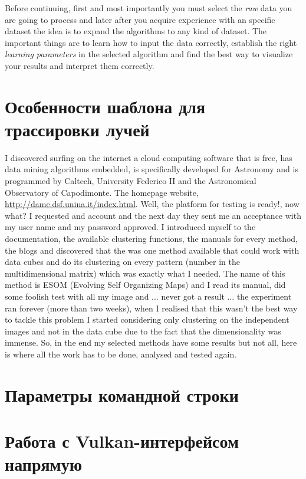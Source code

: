 \documentclass[11pt,fleqn,english,russian]{report} %
\begin{document}
Before continuing, first and most importantly you must select the \emph{raw} data you are going to process and later after you acquire experience with an specific dataset the idea is to expand the algorithms to any kind of dataset. The important things are to learn how to input the data correctly, establish the right \emph{learning parameters} in the selected algorithm and find the best way to visualize your results and interpret them correctly.

\chapter{Особенности шаблона для трассировки лучей}

I discovered surfing on the internet a cloud computing software that is free, has data mining algorithms embedded, is specifically developed for Astronomy and is programmed by Caltech, University Federico II and the Astronomical Observatory of Capodimonte. The homepage website, \url{http://dame.dsf.unina.it/index.html}. Well, the platform for testing is ready!, now what? I requested and account and the next day they sent me an acceptance with my user name and my password approved.
I introduced myself to the documentation, the available clustering functions, the manuals for every method, the blogs and discovered that the was one method available that could work with data cubes and do its clustering on every pattern (number in the multidimensional matrix) which was exactly what I needed. The name of this method is ESOM (Evolving Self Organizing Maps) and I read its manual, did some foolish test with all my image and ... never got a result ... the experiment ran forever (more than two weeks), when I realised that this wasn't the best way to tackle this problem I started considering only clustering on the independent images and not in the data cube due to the fact that the dimensionality was immense. So, in the end my selected methods have some results but not all, here is where all the work has to be done, analysed and tested again.

\chapter{Параметры командной строки}


\chapter{Работа с Vulkan-интерфейсом напрямую}\label{vulkan-direct}
\end{document}
